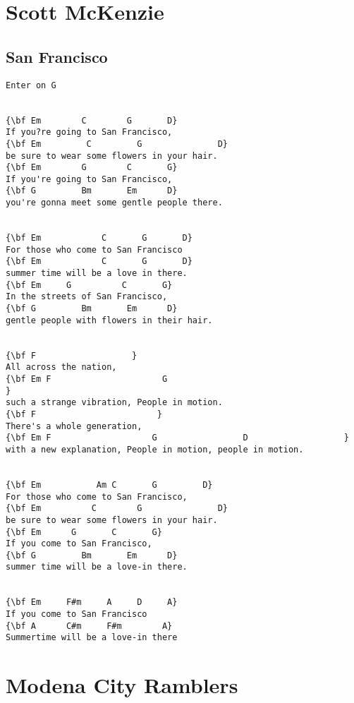 \documentclass[a4paper]{article}
\begin{document}
\section{Scott McKenzie} %
\label{sec:Scott McKenzie}
\subsection{San Francisco} %
\label{sub:San Francisco}
\begin{Verbatim}[commandchars=\\\{\}]
Enter on G


{\bf Em        C        G       D}
If you?re going to San Francisco,
{\bf Em         C         G               D}
be sure to wear some flowers in your hair.
{\bf Em        G        C       G}
If you're going to San Francisco,
{\bf G         Bm       Em      D}
you're gonna meet some gentle people there.


{\bf Em            C       G       D}
For those who come to San Francisco
{\bf Em            C       G       D}
summer time will be a love in there.
{\bf Em     G          C       G}
In the streets of San Francisco,
{\bf G         Bm       Em      D}
gentle people with flowers in their hair.


{\bf F                   }
All across the nation,
{\bf Em F                      G                                            }
such a strange vibration, People in motion.
{\bf F                        }
There's a whole generation,
{\bf Em F                    G                 D                   }
with a new explanation, People in motion, people in motion.


{\bf Em           Am C       G         D}
For those who come to San Francisco,
{\bf Em          C        G               D}
be sure to wear some flowers in your hair.
{\bf Em      G       C       G}
If you come to San Francisco,
{\bf G         Bm       Em      D}
summer time will be a love-in there.


{\bf Em     F#m     A     D     A}
If you come to San Francisco
{\bf A      C#m     F#m        A}
Summertime will be a love-in there
\end{Verbatim}
\newpage
\section{Modena City Ramblers} %
\label{sec:Modena City Ramblers}
\end{document}
